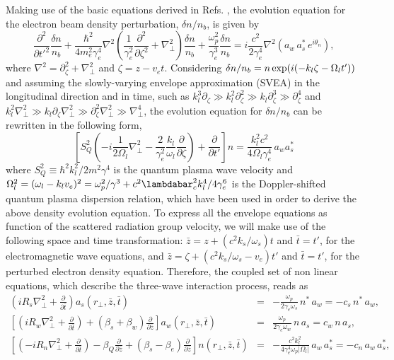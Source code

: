 \documentclass[aps,pra,preprint,showpacs,preprintnumbers,amsmath,amssymb]{revtex4-1}
\begin{document}
Making use of the basic equations derived in Refs. \cite{lfmonteiro, serbetoqfel}, the evolution equation for the electron beam density perturbation, $\delta n/n_{b}$, is given by
\begin{equation}
\frac{\partial^2}{\partial t'^2}\frac{\delta n}{n_b} + \frac{\hbar^2}{4 m_e^2 \gamma_e^4 } \nabla^2 \left( \frac{1}{\gamma_e^2}\frac{\partial^2}{\partial \zeta^2} + \nabla_\perp^2 \right) \frac{\delta n}{n_b} + \frac{\omega_p^2}{\gamma_e^3} \frac{\delta n}{n_b} = i \frac{c^2}{2\gamma_e^4} \nabla^2(a_w \, a_s^*\, e^{i \theta_n}), 
\end{equation}
where $\nabla^2 = \partial_\zeta^2 + \nabla_\perp^2$ and $\zeta = z - v_{e}t$. Considering $\delta n /n_b = n\,\textnormal{exp}(i(-k_l \zeta- \Omega_l t'))$ and assuming the slowly-varying envelope approximation (SVEA) in the longitudinal direction and in time, such as $k_l^3 \partial_\zeta \gg k_l^2 \partial^2_\zeta \gg k_l \partial^3_\zeta \gg \partial^4_\zeta $  and $k_l^2 \nabla^2_\perp \gg k_l \partial_\zeta \nabla^2_\perp \gg  \partial^2_\zeta \nabla^2_\perp \gg \nabla^4_\perp $, the evolution equation for $\delta n/n_{b}$ can be rewritten in the following form,
\begin{equation}
\left[ S_Q^2 \left( -i \frac{1}{2\Omega_l} \nabla_\perp^2 - \frac{2}{\gamma_e^2}\frac{k_l}{\omega_l} \frac{\partial}{\partial \zeta} \right) + \frac{\partial}{\partial t'} \right] n = \frac{k_l^2 c^2}{4 \Omega_l \gamma_e^4} \, a_w a_s^*
\end{equation}
where $S_Q^2 \equiv \hbar^2 k_l^2/2  m^2 \gamma^4$ is the quantum plasma wave velocity and $\Omega_l^2 = (\omega_l - k_l v_e)^2 = \omega_p^2/ \gamma^3 + c^2 \lambdabar_c^2 k_l^4/ 4\gamma_e^6$ is the Doppler-shifted quantum plasma dispersion relation, which have been used in order to derive the above density evolution equation. To express  all the envelope equations as function  of the scattered radiation group velocity, we will make use of the following space and time  transformation: $ \bar{z} = z + (c^2k_s/\omega_s) t$ and $\bar{t} = t'$,  for the electromagnetic wave equations, and $\bar{z} = \zeta + (c^2k_s/\omega_s - v_e) t'$ and $\bar{t} = t' $, for the perturbed electron density equation. Therefore, the coupled set of non linear equations, which describe the  three-wave interaction process, reads as 
\begin{eqnarray}
\left( i R_s \nabla^2_\perp + \frac{\partial}{\partial \bar{t}} \right)  a_s(r_\perp,\bar{z},\bar{t})  &=&  -\frac{\omega_p}{2 \gamma_e \omega_s}\, n^*\, a_w  = - c_s \, n^*\, a_w \label{as}, \\ 
\left[  \left( i R_w\nabla^2_\perp +  \frac{\partial}{\partial \bar{t}}\right)  + (\beta_s + \beta_w)\frac{\partial}{\partial \bar{z}}  \right] a_w(r_\perp,\bar{z},\bar{t}) &=&  \frac{\omega_p}{2 \gamma_e \omega_w}\, n\, a_s  = c_w \, n\, a_s \label{aw}, \\
\left[ \left(-i R_n   \nabla_\perp^2 + \frac{\partial}{\partial \bar{t}} \right) -\beta_Q \frac{\partial}{\partial \bar{z}} + (\beta_s - \beta_e)\frac{\partial}{\partial \bar{z}} \right] n(r_\perp,\bar{z},\bar{t}) &=& - \frac{c^2 k_l^2}{4 \gamma_e^4 \omega_p |\Omega_l| }\,a_w\, a_s^* = -c_n \,a_w\, a_s^*  \label{n},
\end{eqnarray}  
\end{document}
